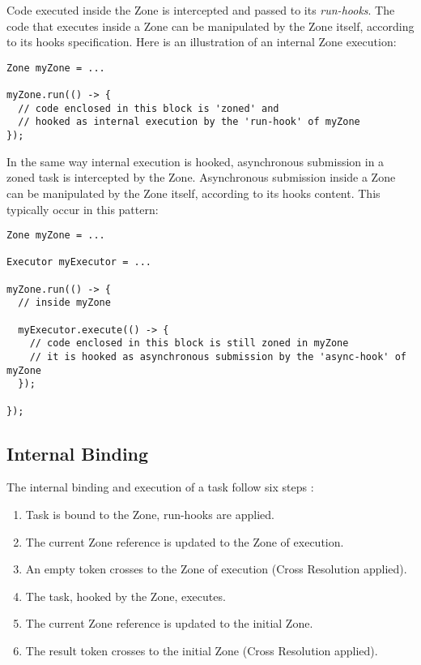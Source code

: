 Code executed inside the Zone is intercepted and passed to its \emph{run-hooks}. The code that executes inside a Zone can be manipulated by the Zone itself, according to its hooks specification. Here is an illustration of an internal Zone execution:

\begin{lstlisting}
Zone myZone = ...

myZone.run(() -> {
  // code enclosed in this block is 'zoned' and
  // hooked as internal execution by the 'run-hook' of myZone
});
\end{lstlisting}

In the same way internal execution is hooked, asynchronous submission in a zoned task is intercepted by the Zone.
Asynchronous submission inside a Zone can be manipulated by the Zone itself, according to its hooks content. This typically occur in this pattern:

\begin{lstlisting}
Zone myZone = ...

Executor myExecutor = ...

myZone.run(() -> {
  // inside myZone

  myExecutor.execute(() -> {
    // code enclosed in this block is still zoned in myZone
    // it is hooked as asynchronous submission by the 'async-hook' of myZone
  });
  
});
\end{lstlisting}

\subsection*{Internal Binding}

The internal binding and execution of a task follow six steps :
\begin{enumerate}
\item Task is bound to the Zone, run-hooks are applied.
\item The current Zone reference is updated to the Zone of execution.
\item An empty token crosses to the Zone of execution (Cross Resolution applied).
\item The task, hooked by the Zone, executes.
\item The current Zone reference is updated to the initial Zone.
\item The result token crosses to the initial Zone (Cross Resolution applied).
\end{enumerate}

